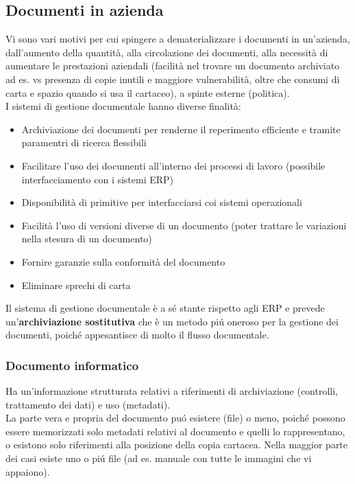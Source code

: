 \subsection{Documenti in azienda}

Vi sono vari motivi per cui spingere a dematerializzare i documenti in
un'azienda, dall'aumento della quantit\`a, alla circolazione dei
documenti, alla necessit\`a di aumentare le prestazioni aziendali
(facilit\`a nel trovare un documento archiviato ad es. vs presenza di
copie inutili e maggiore vulnerabilit\`a, oltre che consumi di carta e
spazio quando si usa il cartaceo), a spinte esterne (politica).\\
I sistemi di gestione documentale hanno diverse finalit\`a:

\begin{itemize}

\item
  Archiviazione dei documenti per renderne il reperimento efficiente e tramite 
  paramentri di ricerca flessibili
\item 
  Facilitare l'uso dei documenti all'interno dei processi di lavoro (possibile
  interfacciamento con i sistemi ERP)
\item
  Disponibilit\`a di primitive per interfacciarsi coi sistemi operazionali
\item
  Facilit\`a l'uso di versioni diverse di un documento (poter trattare le
  variazioni nella stesura di un documento)
\item
  Fornire garanzie sulla conformit\`a del documento
\item
  Eliminare sprechi di carta
\end{itemize}

Il sistema di gestione documentale \`e a s\'e stante rispetto agli ERP e
prevede un'\textbf{archiviazione sostitutiva} che \`e un metodo pi\'u oneroso 
per la gestione dei documenti, poich\'e appesantisce di molto il flusso
documentale.

\subsubsection{Documento informatico}

Ha un'informazione strutturata relativi a riferimenti di archiviazione
(controlli, trattamento dei dati) e uso (metadati).\\
La parte vera e propria del documento pu\'o esistere (file) o meno, poich\'e
possono essere memorizzati solo metadati relativi al documento e quelli
lo rappresentano, o esistono solo riferimenti alla posizione della copia
cartacea. Nella maggior parte dei casi esiste uno o pi\'u file (ad es.
manuale con tutte le immagini che vi appaiono).

